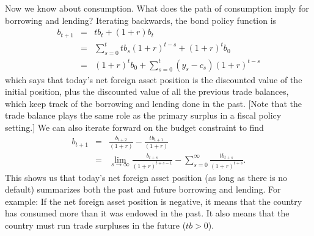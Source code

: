 \documentclass[11pt,pdftex,twoside,letterpaper]{exam}
\begin{document}
Now we know about consumption. What does the path of consumption imply for borrowing and lending? Iterating backwards, the bond policy function is
\begin{eqnarray}
  b_{t+1} &=& tb_t+(1+r)b_t\\
   &=& \sum_{s=0}^{t} tb_s(1+r)^{t-s}+(1+r)^tb_0\\
   &=& (1+r)^tb_0+\sum_{s=0}^{t} (y_s-c_s)(1+r)^{t-s}\label{eq:b-backward}
\end{eqnarray}
which says that today's net foreign asset position is the discounted value of the initial position, plus the discounted value of all the previous trade balances, which keep track of the borrowing and lending done in the past. [Note that the trade balance plays the same role as the primary surplus in a fiscal policy setting.] We can also iterate forward on the budget constraint to find
\begin{eqnarray}
   b_{t+1} &=& \frac{b_{t+2}}{(1+r)}-\frac{tb_{t+1}}{(1+r)}\\
   &=& \lim_{s\rightarrow\infty} \frac{b_{t+s}}{(1+r)^{t+s-1}}-\sum_{s=0}^{\infty}  \frac{tb_{t+s}}{(1+r)^{t+s}}. \label{eq:b-forward}
\end{eqnarray}
This shows us that today's net foreign asset position (as long as there is no default) summarizes both the past and future borrowing and lending. For example: If the net foreign asset position is negative, it means that the country has consumed more than it was endowed in the past. It also means that the country must run trade surpluses in the future ($tb>0$).
\end{document}
